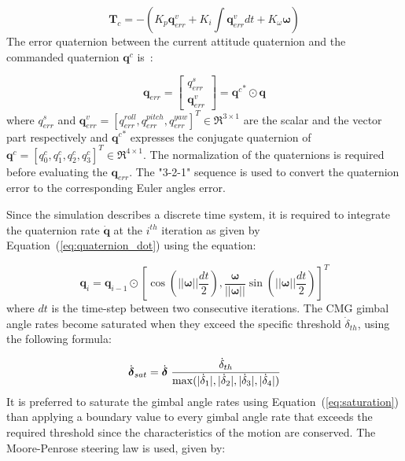 \documentclass[aerospace,article,submit,moreauthors,dvi2pdf]{Definitions/mdpi}
\begin{document}
\begin{equation}
\textbf{T}_c=-(K_p\textbf{q}_{err}^v
+K_i\int\textbf{q}_{err}^vdt+K_{\omega}\boldsymbol{\omega})
\end{equation}
The error quaternion between the current attitude quaternion and the commanded quaternion $\textbf{q}^c$ is : 

\begin{equation}
\textbf{q}_{err}=
\begin{bmatrix}
q_{err}^s\\
\textbf{q}_{err}^v
\end{bmatrix}={\textbf{q}^{c}}^{*}\odot\textbf{q}
\end{equation}
where $q_{err}^s$ and $\textbf{q}_{err}^v=[q_{err}^{roll}, q_{err}^{pitch}, q_{err}^{yaw}]^T \in\Re^{3\times1}$ are the scalar and the vector part respectively and ${\textbf{q}^{c}}^{*}$ expresses the conjugate quaternion of $\textbf{q}^c=[q^{c}_0, q^{c}_1, q^{c}_2, q^{c}_3]^T\in\Re^{4\times1}$. The normalization of the quaternions is required before evaluating the $\textbf{q}_{err}$. The "3-2-1" sequence is used to convert the quaternion error to the corresponding Euler angles error.

Since the simulation describes a discrete time system, it is required to integrate the quaternion rate $\dot{\textbf{q}}$ at the $i^{th}$ iteration as given by Equation~(\ref{eq:quaternion_dot}) using the equation:

\begin{equation}
\textbf{q}_i=\textbf{q}_{i-1}\odot[\cos(||\boldsymbol{\omega}||\frac{dt}{2}), \frac{\boldsymbol{\omega}}{||\boldsymbol{\omega}||}\sin(||\boldsymbol{\omega}||\frac{dt}{2})]^T
\end{equation}
where $dt$ is the time-step between two consecutive iterations.
The CMG gimbal angle rates become saturated when they exceed the specific threshold $\dot{{\delta}}_{th}$, using the following formula:

\begin{equation}
\label{eq:saturation}
\dot{\boldsymbol{\delta}}_{sat}=\dot{\boldsymbol{\delta}}\hspace{0.1cm}\frac{\dot{{\delta}}_{th}}{\max(|\dot{\delta}_1|,|\dot{\delta}_2|,|\dot{\delta}_3|,|\dot{\delta}_4|)}
\end{equation}
It is preferred to saturate the gimbal angle rates using Equation~(\ref{eq:saturation}) than applying a boundary value to every gimbal angle rate that exceeds the required threshold since the characteristics of the motion are conserved. 
The Moore-Penrose steering law is used, given by:
\end{document}
